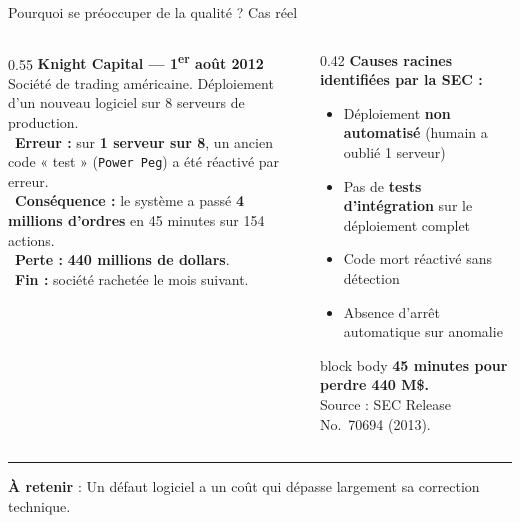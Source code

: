\documentclass[aspectratio=169,11pt]{beamer}
\newcommand{\takeaway}[1]{%
\vfill\begin{beamercolorbox}[wd=\linewidth,sep=0.4em]{}
\color{accent2}\rule[0.6ex]{1.2em}{1.2pt}\hspace{0.4em}%
\textbf{\color{accent2}\small À retenir} \textcolor{textsoft}{:} %
{\small\color{textmain}#1}
\end{beamercolorbox}}
\newcommand{\non}[1]{\textcolor{bad}{\ding{55}}~#1}
\begin{document}
\begin{frame}[t]{Pourquoi se préoccuper de la qualité ? Cas réel}
\begin{columns}[T,onlytextwidth]
\begin{column}{0.55\textwidth}
\vspace{0.1cm}
\textbf{\color{accent}Knight Capital --- 1\textsuperscript{er} août 2012}\\[0.3em]
\footnotesize
Société de trading américaine. Déploiement d'un nouveau logiciel sur 8 serveurs de production.\\[0.5em]
\non{\textbf{Erreur :}} sur \textbf{1 serveur sur 8}, un ancien code « test » (\texttt{Power Peg}) a été réactivé par erreur.\\[0.5em]
\non{\textbf{Conséquence :}} le système a passé \textbf{4 millions d'ordres} en 45 minutes sur 154 actions.\\[0.5em]
\non{\textbf{Perte :}} \textbf{440 millions de dollars}.\\[0.5em]
\non{\textbf{Fin :}} société rachetée le mois suivant.
\end{column}
\begin{column}{0.42\textwidth}
\vspace{0.1cm}
\textbf{Causes racines identifiées par la SEC :}\\[0.3em]
\footnotesize
\begin{itemize}\scriptsize
    \item Déploiement \textbf{non automatisé} (humain a oublié 1 serveur)
    \item Pas de \textbf{tests d'intégration} sur le déploiement complet
    \item Code mort réactivé sans détection
    \item Absence d'arrêt automatique sur anomalie
\end{itemize}
\vspace{0.3em}
\begin{beamercolorbox}[sep=0.4em,rounded=true]{block body}
\scriptsize\color{bad}\textbf{45 minutes pour perdre 440 M\$.}\\
{\color{textsoft}Source : SEC Release No.~70694 (2013).}
\end{beamercolorbox}
\end{column}
\end{columns}
\takeaway{Un défaut logiciel a un coût qui dépasse largement sa correction technique.}
\end{frame}
\end{document}
